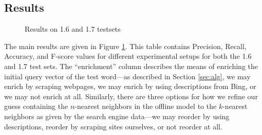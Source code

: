 \documentclass{article}
\begin{document}
\subsection{Results}
\begin{figure}[htbp]
\caption{Results on 1.6 and 1.7 testsets}
\label{fig:res}
\end{figure}

The main results are given in Figure \ref{fig:res}.
This table contains Precision, Recall, Accuracy, and F-score values for different experimental setups for both the 1.6 and 1.7 test sets.
The ``enrichment'' column describes the means of enriching the initial query vector of the test word---as described in Section \ref{sec:alg}, we may enrich by scraping webpages, we may enrich by using descriptions from Bing, or we may not enrich at all.
Similarly, there are three options for how we refine our guess containing the $n$-nearest neighbors in the offline model to the $k$-nearest neighbors as given by the search engine data---we may reorder by using descriptions, reorder by scraping sites ourselves, or not reorder at all.
\end{document}
